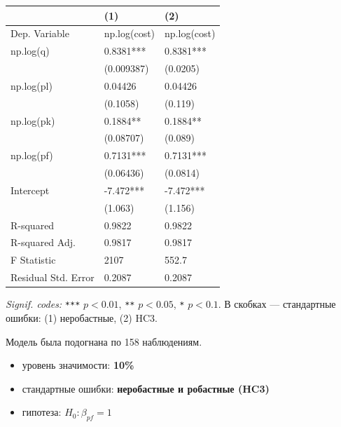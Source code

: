 \documentclass[
  russian,
]{article}
\newcounter{none} %
\providecommand{\tightlist}{%
  \setlength{\itemsep}{0pt}\setlength{\parskip}{0pt}}
\begin{document}
{\def\LTcaptype{none} %
\begin{longtable}[]{@{}lll@{}}
\toprule\noalign{}
& (1) & (2) \\
\midrule\noalign{}
\endhead
\bottomrule\noalign{}
\endlastfoot
Dep. Variable & np.log(cost) & np.log(cost) \\
np.log(q) & 0.8381*** & 0.8381*** \\
& (0.009387) & (0.0205) \\
np.log(pl) & 0.04426 & 0.04426 \\
& (0.1058) & (0.119) \\
np.log(pk) & 0.1884** & 0.1884** \\
& (0.08707) & (0.089) \\
np.log(pf) & 0.7131*** & 0.7131*** \\
& (0.06436) & (0.0814) \\
Intercept & -7.472*** & -7.472*** \\
& (1.063) & (1.156) \\
R-squared & 0.9822 & 0.9822 \\
R-squared Adj. & 0.9817 & 0.9817 \\
F Statistic & 2107 & 552.7 \\
Residual Std. Error & 0.2087 & 0.2087 \\
\end{longtable}
}

\emph{Signif. codes:} \texttt{***} \(p<0.01\), \texttt{**} \(p<0.05\),
\texttt{*} \(p<0.1\). В скобках --- стандартные ошибки: (1) неробастные,
(2) HC3.

Модель была подогнана по 158 наблюдениям.

\begin{tcolorbox}[enhanced jigsaw, arc=.35mm, bottomrule=.15mm, bottomtitle=1mm, breakable, colback=white, colbacktitle=quarto-callout-important-color!10!white, colframe=quarto-callout-important-color-frame, coltitle=black, left=2mm, leftrule=.75mm, opacityback=0, opacitybacktitle=0.6, rightrule=.15mm, title=\textcolor{quarto-callout-important-color}{\faExclamation}\hspace{0.5em}{Условия теста}, titlerule=0mm, toprule=.15mm, toptitle=1mm]

\begin{itemize}
\tightlist
\item
  уровень значимости: \textbf{10\%}
\item
  стандартные ошибки: \textbf{неробастные и робастные (HC3)}
\item
  гипотеза: \(H_0:\beta_{pf}=1\)
\end{itemize}

\end{tcolorbox}
\end{document}
